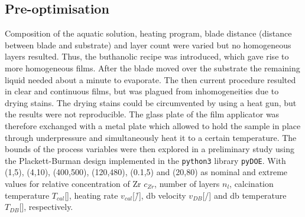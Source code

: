 \subsection{Pre-optimisation}
Composition of the aquatic solution, heating program, blade distance (distance between 
blade and substrate) and layer count were varied but no homogeneous layers resulted. 
Thus, 
the buthanolic recipe was introduced, which gave rise to more homogeneous films.
After the blade moved over the substrate the remaining liquid needed about a minute 
to evaporate. 
The then current procedure resulted in clear and continuous films, but was plagued from 
inhomogeneities due to drying stains. 
The drying stains could be circumvented by using a heat gun, but the results were not 
reproducible. 
The glass plate of the film applicator was therefore exchanged with a metal plate which 
allowed to hold the sample in place through underpressure and simultaneously heat it to a certain 
temperature. The bounds of the process variables were then explored in a preliminary study 
using the Plackett-Burman \cite{Plackett1946} design implemented in the \texttt{python3} 
library \texttt{pyDOE}. With 
(1,5), (4,10), (400,500), (120,480), (0.1,5) and  (20,80) 
as nominal and extreme values for 
relative concentration of Zr $c_{Zr}$, number of layers $n_{l}$, calcination temperature $T_{cal}$[\oc{}], heating rate $v_{cal}$[\oc{}/\h{}], \gls{db} velocity $v_{DB}$[\mm{}/\s{}] and \gls{db} temperature $T_{DB}$[\oc{}], respectively. 
